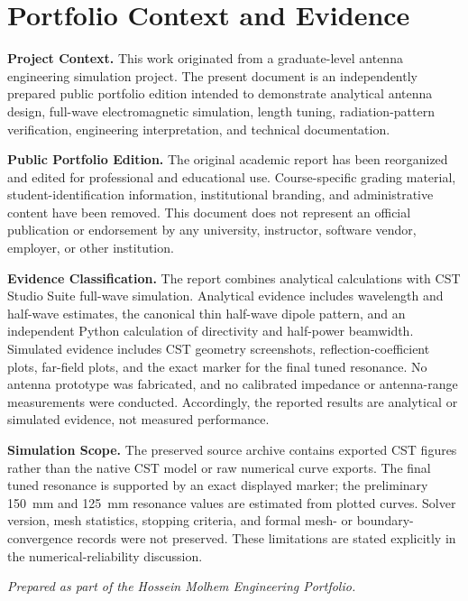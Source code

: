 
\chapter*{Portfolio Context and Evidence}
\thispagestyle{fancy}

\noindent
\textbf{Project Context.}
This work originated from a graduate-level antenna engineering simulation project.
The present document is an independently prepared public portfolio edition intended
to demonstrate analytical antenna design, full-wave electromagnetic simulation,
length tuning, radiation-pattern verification, engineering interpretation, and
technical documentation.

\vspace{0.5em}

\noindent
\textbf{Public Portfolio Edition.}
The original academic report has been reorganized and edited for professional and
educational use. Course-specific grading material, student-identification information,
institutional branding, and administrative content have been removed. This document
does not represent an official publication or endorsement by any university,
instructor, software vendor, employer, or other institution.

\vspace{0.5em}

\noindent
\textbf{Evidence Classification.}
The report combines analytical calculations with CST Studio Suite full-wave simulation.
Analytical evidence includes wavelength and half-wave estimates, the canonical thin
half-wave dipole pattern, and an independent Python calculation of directivity and
half-power beamwidth. Simulated evidence includes CST geometry screenshots,
reflection-coefficient plots, far-field plots, and the exact marker for the final tuned
resonance. No antenna prototype was fabricated, and no calibrated impedance or
antenna-range measurements were conducted. Accordingly, the reported results are
analytical or simulated evidence, not measured performance.

\vspace{0.5em}

\noindent
\textbf{Simulation Scope.}
The preserved source archive contains exported CST figures rather than the native CST
model or raw numerical curve exports. The final tuned resonance is supported by an
exact displayed marker; the preliminary 150~mm and 125~mm resonance values are
estimated from plotted curves. Solver version, mesh statistics, stopping criteria, and
formal mesh- or boundary-convergence records were not preserved. These limitations
are stated explicitly in the numerical-reliability discussion.

\vfill

\begin{center}
    \textit{Prepared as part of the Hossein Molhem Engineering Portfolio.}
\end{center}
